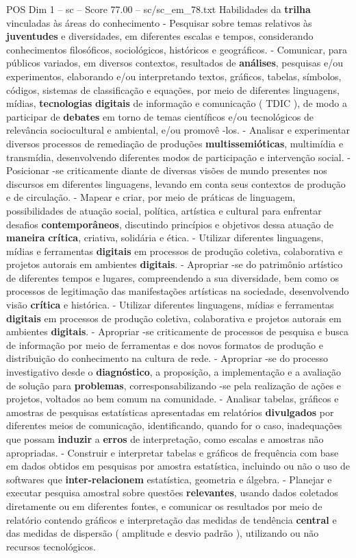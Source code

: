 \begin{textsample}{POS Dim 1 – sc – Score 77.00 – sc/sc\_em\_78.txt}
Habilidades da \textbf{trilha} vinculadas às áreas do conhecimento - Pesquisar sobre temas relativos às \textbf{juventudes} e diversidades, em diferentes escalas e tempos, considerando conhecimentos filosóficos, sociológicos, históricos e geográficos. - Comunicar, para públicos variados, em diversos contextos, resultados de \textbf{análises}, pesquisas e/ou experimentos, elaborando e/ou interpretando textos, gráficos, tabelas, símbolos, códigos, sistemas de classificação e equações, por meio de diferentes linguagens, mídias, \textbf{tecnologias} \textbf{digitais} de informação e comunicação ( TDIC ), de modo a participar de \textbf{debates} em torno de temas científicos e/ou tecnológicos de relevância sociocultural e ambiental, e/ou promovê -los. - Analisar e experimentar diversos processos de remediação de produções \textbf{multissemióticas}, multimídia e transmídia, desenvolvendo diferentes modos de participação e intervenção social. - Posicionar -se criticamente diante de diversas visões de mundo presentes nos discursos em diferentes linguagens, levando em conta seus contextos de produção e de circulação. - Mapear e criar, por meio de práticas de linguagem, possibilidades de atuação social, política, artística e cultural para enfrentar desafios \textbf{contemporâneos}, discutindo princípios e objetivos dessa atuação de \textbf{maneira} \textbf{crítica}, criativa, solidária e ética. - Utilizar diferentes linguagens, mídias e ferramentas \textbf{digitais} em processos de produção coletiva, colaborativa e projetos autorais em ambientes \textbf{digitais}. - Apropriar -se do patrimônio artístico de diferentes tempos e lugares, compreendendo a sua diversidade, bem como os processos de legitimação das manifestações artísticas na sociedade, desenvolvendo visão \textbf{crítica} e histórica. - Utilizar diferentes linguagens, mídias e ferramentas \textbf{digitais} em processos de produção coletiva, colaborativa e projetos autorais em ambientes \textbf{digitais}. - Apropriar -se criticamente de processos de pesquisa e busca de informação por meio de ferramentas e dos novos formatos de produção e distribuição do conhecimento na cultura de rede. - Apropriar -se do processo investigativo desde o \textbf{diagnóstico}, a proposição, a implementação e a avaliação de solução para \textbf{problemas}, corresponsabilizando -se pela realização de ações e projetos, voltados ao bem comum na comunidade. - Analisar tabelas, gráficos e amostras de pesquisas estatísticas apresentadas em relatórios \textbf{divulgados} por diferentes meios de comunicação, identificando, quando for o caso, inadequações que possam \textbf{induzir} a \textbf{erros} de interpretação, como escalas e amostras não apropriadas. - Construir e interpretar tabelas e gráficos de frequência com base em dados obtidos em pesquisas por amostra estatística, incluindo ou não o uso de softwares que \textbf{inter-relacionem} estatística, geometria e álgebra. - Planejar e executar pesquisa amostral sobre questões \textbf{relevantes}, usando dados coletados diretamente ou em diferentes fontes, e comunicar os resultados por meio de relatório contendo gráficos e interpretação das medidas de tendência \textbf{central} e das medidas de dispersão ( amplitude e desvio padrão ), utilizando ou não recursos tecnológicos.

\end{textsample}
